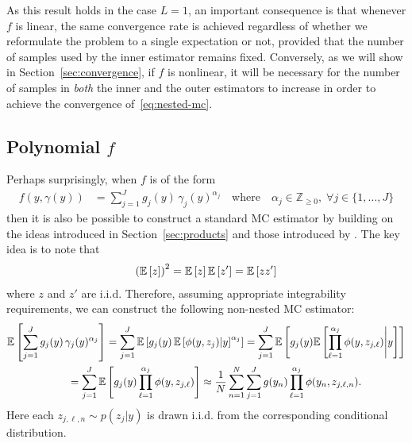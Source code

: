 As this result holds in the case $L=1$, an important consequence is that
whenever $f$ is linear, the same convergence rate is achieved regardless of whether we
reformulate the problem to a single expectation or not, provided that the number of samples
used by the inner estimator remains fixed.  
Conversely, as we will show in Section~\ref{sec:convergence},
if $f$ is nonlinear, it will be necessary for the number of samples in \emph{both} the inner and the 
outer estimators to increase in order to achieve the convergence of~\eqref{eq:nested-mc}. 

\subsection{Polynomial $f$}
\label{sec:polynomial}

Perhaps surprisingly, when $f$ is of the form
\begin{align}
  f(y,\gamma(y)) &= \sum_{j=1}^{J} g_j(y) \, \gamma_j(y)^{\alpha_j} \quad \text{where}
  \quad \alpha_j \in \mathbb{Z}_{\geq 0}, \; \forall j \in \{1,\dots,J\}
\end{align}
then it is also be possible to construct a standard MC estimator by building on the ideas
introduced in Section~\ref{sec:products} and those introduced by \cite{goda2016computing}.
The key idea is to note that
\begin{align*}
\left(\mathbb{E} \left[z\right]\right)^2 = \mathbb{E} \left[z\right]\mathbb{E} \left[z'\right] = \mathbb{E} \left[z z'\right]
\end{align*}
where $z$ and $z'$ are i.i.d.  Therefore, assuming appropriate integrability requirements,
we can construct the following non-nested MC estimator:
\begin{align}
\mathbb{E}\left[\sum_{j=1}^{J} g_j(y) \, \gamma_j(y)^{\alpha_j}\right] &= 
\sum_{j=1}^{J} \mathbb{E}\left[g_j(y) \, \mathbb{E}\left[\phi(y,z_{j}) | y\right]^{\alpha_j}\right]
=\sum_{j=1}^{J} \mathbb{E}\left[g_j(y) \mathbb{E}\left[\prod_{\ell=1}^{\alpha_j} \phi(y,z_{j,\ell}) \middle|y\right]\right] \nonumber \\
=\sum_{j=1}^{J} \mathbb{E}&\left[g_j(y)\prod_{\ell=1}^{\alpha_j} \phi(y,z_{j,\ell})\right]
\approx \frac{1}{N} \sum_{n=1}^{N} \sum_{j=1}^{J} g(y_n)\prod_{\ell=1}^{\alpha_j} \phi(y_n,z_{j,\ell,n}).
\end{align}
Here each $z_{j,\ell,n} \sim p(z_j | y)$ is drawn i.i.d. from the corresponding conditional distribution.

